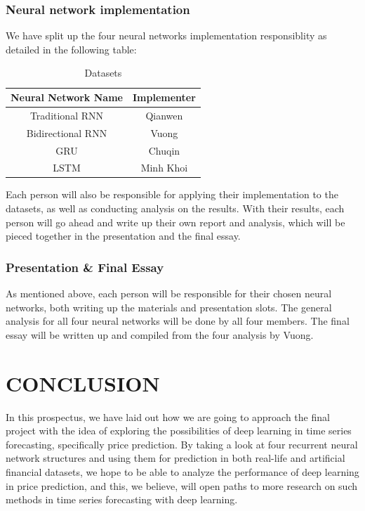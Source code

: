\documentclass[letterpaper, 10 pt, conference]{ieeeconf}  %
\begin{document}
    \subsubsection{Neural network implementation} We have split up the four neural networks implementation responsiblity as detailed in the following table:
    \begin{table}[h!] \centering
        \caption{Datasets }
        \begin{threeparttable}
                \begin{tabular}{|c|c|}
                    \hline
                    Neural Network Name & Implementer\\
                    \hline
                    Traditional RNN & Qianwen\\
                    Bidirectional RNN & Vuong\\
                    GRU & Chuqin\\
                    LSTM & Minh Khoi\\
                    \hline
                \end{tabular}
        \end{threeparttable}
    \end{table}

    Each person will also be responsible for applying their implementation to the datasets, as well as conducting analysis on the results. With their results, each person will go ahead and write up their own report and analysis, which will be pieced together in the presentation and the final essay.

    \subsubsection{Presentation \& Final Essay} As mentioned above, each person will be responsible for their chosen neural networks, both writing up the materials and presentation slots. The general analysis for all four neural networks will be done by all four members. The final essay will be written up and compiled from the four analysis by Vuong.

\section{CONCLUSION}
    In this prospectus, we have laid out how we are going to approach the final project with the idea of exploring the possibilities of deep learning in time series forecasting, specifically price prediction. By taking a look at four recurrent neural network structures and using them for prediction in both real-life and artificial financial datasets, we hope to be able to analyze the performance of deep learning in price prediction, and this, we believe, will open paths to more research on such methods in time series forecasting with deep learning. 
\end{document}
